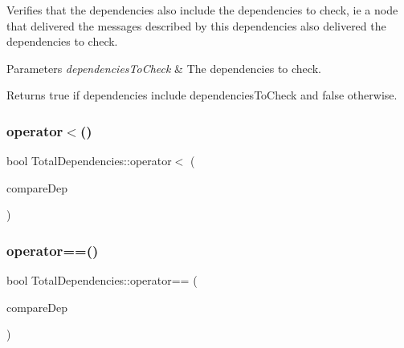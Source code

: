 Verifies that the dependencies also include the dependencies to check, ie a node that delivered the messages described by this dependencies also delivered the dependencies to check. 


\begin{DoxyParams}{Parameters}
{\em dependencies\+To\+Check} & The dependencies to check. \\
\hline
\end{DoxyParams}
\begin{DoxyReturn}{Returns}
true if dependencies include dependencies\+To\+Check and false otherwise. 
\end{DoxyReturn}
\mbox{\label{class_total_dependencies_ae5899d93bd269484c5ed6b5809d8d500}} 
\subsubsection{\texorpdfstring{operator$<$()}{operator<()}}
{\footnotesize\ttfamily bool Total\+Dependencies\+::operator$<$ (\begin{DoxyParamCaption}\item[{const \hyperlink{class_total_dependencies}{Total\+Dependencies} \&}]{compare\+Dep }\end{DoxyParamCaption})}

\mbox{\label{class_total_dependencies_a8e3f326e355d9bb0364f160dcf0a4126}} 
\subsubsection{\texorpdfstring{operator==()}{operator==()}}
{\footnotesize\ttfamily bool Total\+Dependencies\+::operator== (\begin{DoxyParamCaption}\item[{const \hyperlink{class_total_dependencies}{Total\+Dependencies} \&}]{compare\+Dep }\end{DoxyParamCaption})}

\mbox{\label{class_total_dependencies_a3ec4e57f16606c11d6bd9de29a93c045}} 
